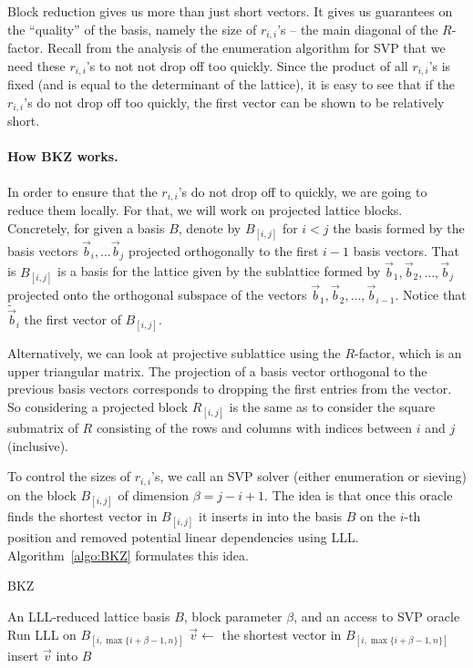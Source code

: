 Block reduction gives us more than just short vectors. It gives us guarantees on the “quality” of the basis, namely the size of $r_{i,i}$'s -- the main diagonal of the $R$-factor. Recall from the analysis of the enumeration algorithm for SVP that we need these $r_{i,i}$'s to not  not drop off too quickly. Since the product of all $r_{i,i}$'s is fixed  (and is equal to the determinant of the lattice), it is easy to see that if the $r_{i,i}$'s do not drop off too quickly, the first vector can be shown to be relatively short.

\paragraph{How BKZ works.} In order to ensure that the $r_{i,i}$'s do not drop off to quickly, we are going to reduce them locally. For that, we will work on projected lattice blocks. Concretely, for given a basis $B$, denote by $B_{[i,j]}$ for $i<j$ the basis formed by the basis vectors $\vec b_i, \ldots \vec b_j$ projected orthogonally to the first $i-1$ basis vectors. That is $B_{[i,j]}$  is a basis for the lattice given by the sublattice formed by $\vec b_1, \vec b_2, \ldots ,\vec b_j$ projected onto the orthogonal subspace of the vectors $\vec b_1,\vec b_2, \ldots ,\vec{b}_{i-1}$. Notice that $\tilde{\vec{b}}_i$ the first vector of $B_{[i,j]}$. 

Alternatively, we can look at projective sublattice using the $R$-factor, which is an upper triangular matrix.  The projection of a basis vector orthogonal to the previous basis vectors  corresponds to  dropping the first entries from the vector. So considering a projected block $R_{[i,j]}$ is the same as to consider the square submatrix of $R$ consisting of the rows and columns with indices between $i$ and $j$ (inclusive).

To control the sizes of $r_{i,i}$'s,  we call an SVP solver (either enumeration or sieving) on the block $B_{[i,j]}$ of dimension $\beta = j-i+1$. The idea is that once this oracle finds the shortest vector in $B_{[i,j]}$ it inserts in into the basis $B$ on the $i$-th position and removed potential linear dependencies using LLL. Algorithm~\ref{algo:BKZ} formulates this idea.

\begin{algorithm}
	\caption{BKZ}
	\label{algo:BKZ}
	\begin{algorithmic}[1]
		\REQUIRE An LLL-reduced lattice basis $B$, block parameter $\beta$, and an access to SVP oracle
		\REPEAT
 		\STATE Run LLL on $B_{[i,\max\{i+\beta-1, n\}]}$
 		\STATE $\vec v \gets$ the shortest vector in $B_{[i,\max\{i+\beta-1, n\}]}$
 		\STATE insert $\vec v$ into $B$
 		\ENDFOR
		\STATE {}
	\end{algorithmic}
\end{algorithm} 


